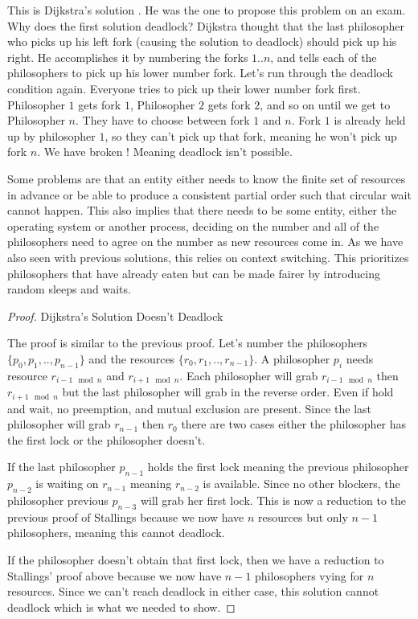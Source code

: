 This is Dijkstra's solution \cite[P. 20]{EWD:EWD310}. He was the one to propose this problem on an exam.
Why does the first solution deadlock? Dijkstra thought that the last philosopher who picks up his left fork (causing the solution to deadlock) should pick up his right.
He accomplishes it by numbering the forks $1..n$, and tells each of the philosophers to pick up his lower number fork.
Let's run through the deadlock condition again.
Everyone tries to pick up their lower number fork first.
Philosopher $1$ gets fork $1$, Philosopher $2$ gets fork $2$, and so on until we get to Philosopher $n$.
They have to choose between fork $1$ and $n$.
Fork $1$ is already held up by philosopher $1$, so they can't pick up that fork, meaning he won't pick up fork $n$.
We have broken ! Meaning deadlock isn't possible.

Some problems are that an entity either needs to know the finite set of resources in advance or be able to produce a consistent partial order such that circular wait cannot happen.
This also implies that there needs to be some entity, either the operating system or another process, deciding on the number and all of the philosophers need to agree on the number as new resources come in.
As we have also seen with previous solutions, this relies on context switching.
This prioritizes philosophers that have already eaten but can be made fairer by introducing random sleeps and waits.

\begin{proof} Dijkstra's Solution Doesn't Deadlock
	
	The proof is similar to the previous proof.
	Let's number the philosophers $\{p_0, p_1, .., p_{n-1}\}$ and the resources $\{r_0, r_1, .., r_{n-1}\}$.
	A philosopher $p_i$ needs resource $r_{i-1 \mod n}$ and $r_{i + 1 \mod n}$.
	Each philosopher will grab $r_{i-1 \mod n}$ then $r_{i + 1 \mod n}$ but the last philosopher will grab in the reverse order.
	Even if hold and wait, no preemption, and mutual exclusion are present.
	Since the last philosopher will grab $r_{n-1}$ then $r_0$ there are two cases either the philosopher has the first lock or the philosopher doesn't.
	
	If the last philosopher $p_{n-1}$ holds the first lock meaning the previous philosopher $p_{n-2}$ is waiting on $r_{n-1}$ meaning $r_{n-2}$ is available.
	Since no other blockers, the philosopher previous $p_{n-3}$ will grab her first lock.
	This is now a reduction to the previous proof of Stallings because we now have $n$ resources but only $n-1$ philosophers, meaning this cannot deadlock.
	
	If the philosopher doesn't obtain that first lock, then we have a reduction to Stallings' proof above because we now have $n-1$ philosophers vying for $n$ resources.
	Since we can't reach deadlock in either case, this solution cannot deadlock which is what we needed to show.
	
\end{proof}

